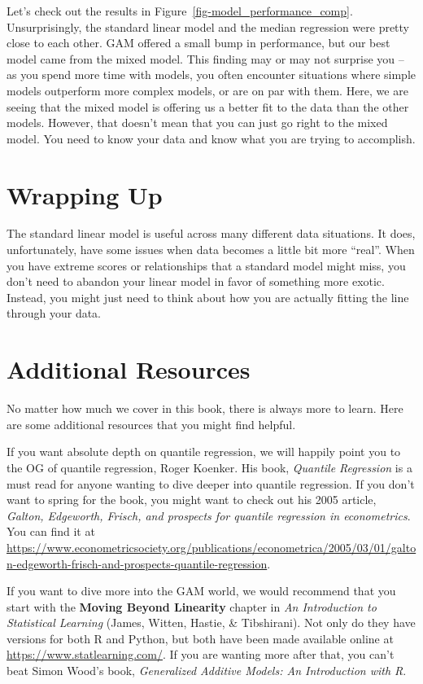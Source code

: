 \documentclass[
  letterpaper,
]{krantz}
\begin{document}
Let's check out the results in Figure~\ref{fig-model_performance_comp}.
Unsurprisingly, the standard linear model and the median regression were
pretty close to each other. GAM offered a small bump in performance, but
our best model came from the mixed model. This finding may or may not
surprise you -- as you spend more time with models, you often encounter
situations where simple models outperform more complex models, or are on
par with them. Here, we are seeing that the mixed model is offering us a
better fit to the data than the other models. However, that doesn't mean
that you can just go right to the mixed model. You need to know your
data and know what you are trying to accomplish.

\section{Wrapping Up}\label{wrapping-up-2}

The standard linear model is useful across many different data
situations. It does, unfortunately, have some issues when data becomes a
little bit more ``real''. When you have extreme scores or relationships
that a standard model might miss, you don't need to abandon your linear
model in favor of something more exotic. Instead, you might just need to
think about how you are actually fitting the line through your data.

\section{Additional Resources}\label{additional-resources-2}

No matter how much we cover in this book, there is always more to learn.
Here are some additional resources that you might find helpful.

If you want absolute depth on quantile regression, we will happily point
you to the OG of quantile regression, Roger Koenker. His book,
\emph{Quantile Regression} is a must read for anyone wanting to dive
deeper into quantile regression. If you don't want to spring for the
book, you might want to check out his 2005 article, \emph{Galton,
Edgeworth, Frisch, and prospects for quantile regression in
econometrics}. You can find it at
\url{https://www.econometricsociety.org/publications/econometrica/2005/03/01/galton-edgeworth-frisch-and-prospects-quantile-regression}.

If you want to dive more into the GAM world, we would recommend that you
start with the \textbf{Moving Beyond Linearity} chapter in \emph{An
Introduction to Statistical Learning} (James, Witten, Hastie, \&
Tibshirani). Not only do they have versions for both R and Python, but
both have been made available online at
\url{https://www.statlearning.com/}. If you are wanting more after that,
you can't beat Simon Wood's book, \emph{Generalized Additive Models: An
Introduction with R}.
\end{document}
